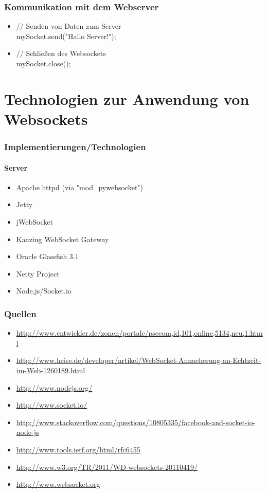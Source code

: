 \documentclass{beamer}
\begin{document}
\begin{frame}
\frametitle{Kommunikation mit dem Webserver}
\begin{itemize}
\item // Senden von Daten zum Server \\
mySocket.send("Hallo Server!"); \\
\item // Schließen des Websockets \\
mySocket.close(); \\
\end{itemize}
\end{frame}

\section{Technologien zur Anwendung von Websockets}
\begin{frame}
\frametitle{Implementierungen/Technologien}
\framesubtitle{Server}
\begin{itemize}
\item Apache httpd (via "mod\_pywebsocket")
\item Jetty
\item jWebSocket
\item Kaazing WebSocket Gateway
\item Oracle Glassfish 3.1
\item Netty Project
\item Node.js/Socket.io
\end{itemize}
\end{frame}

\begin{appendix}
\begin{frame}
\frametitle{Quellen}
\begin{itemize}
\item \url{http://www.entwickler.de/zonen/portale/psecom,id,101,online,5134,neu,1.html}
\item \url{http://www.heise.de/developer/artikel/WebSocket-Annaeherung-an-Echtzeit-im-Web-1260189.html}
\item \url{http://www.nodejs.org/}
\item \url{http://www.socket.io/}
\item \url{http://www.stackoverflow.com/questions/10805335/facebook-and-socket-io-node-js}
\item \url{http://www.tools.ietf.org/html/rfc6455}
\item \url{http://www.w3.org/TR/2011/WD-websockets-20110419/}
\item \url{http://www.websocket.org}
\end{itemize}
\end{frame}
\end{appendix}
\end{document}
